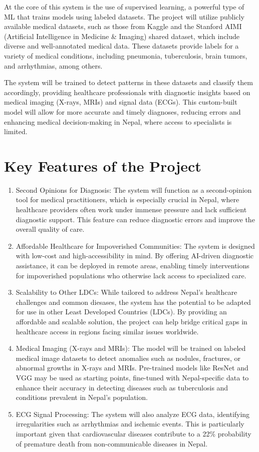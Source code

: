 \documentclass[12pt,a4paper]{report}
\begin{document}
At the core of this system is the use of supervised learning, a powerful type of ML that trains models using labeled datasets. The project will utilize publicly available medical datasets, such as those from Kaggle and the Stanford AIMI (Artificial Intelligence in Medicine \& Imaging) shared dataset, which include diverse and well-annotated medical data. These datasets provide labels for a variety of medical conditions, including pneumonia, tuberculosis, brain tumors, and arrhythmias, among others.

The system will be trained to detect patterns in these datasets and classify them accordingly, providing healthcare professionals with diagnostic insights based on medical imaging (X-rays, MRIs) and signal data (ECGs). This custom-built model will allow for more accurate and timely diagnoses, reducing errors and enhancing medical decision-making in Nepal, where access to specialists is limited.

\section{Key Features of the Project}
\begin{enumerate}
  

  \item  Second Opinions for Diagnosis: The system will function as a second-opinion tool for medical practitioners, which is especially crucial in Nepal, where healthcare providers often work under immense pressure and lack sufficient diagnostic support. This feature can reduce diagnostic errors and improve the overall quality of care.
  \item  Affordable Healthcare for Impoverished Communities: The system is designed with low-cost and high-accessibility in mind. By offering AI-driven diagnostic assistance, it can be deployed in remote areas, enabling timely interventions for impoverished populations who otherwise lack access to specialized care.
  \item  Scalability to Other LDCs: While tailored to address Nepal's healthcare challenges and common diesases, the system has the potential to be adapted for use in other Least Developed Countries (LDCs). By providing an affordable and scalable solution, the project can help bridge critical gaps in healthcare access in regions facing similar issues worldwide.
 
  \item Medical Imaging (X-rays and MRIs): The model will be trained on labeled medical image datasets to detect anomalies such as nodules, fractures, or abnormal growths in X-rays and MRIs. Pre-trained models like ResNet and VGG may be used as starting points, fine-tuned with Nepal-specific data to enhance their accuracy in detecting diseases such as tuberculosis and conditions prevalent in Nepal's population.

 \item ECG Signal Processing: The system will also analyze ECG data, identifying irregularities such as arrhythmias and ischemic events. This is particularly important given that cardiovascular diseases contribute to a 22\% probability of premature death from non-communicable diseases in Nepal\cite{Nepal_profile}.
\end{enumerate}
\end{document}
